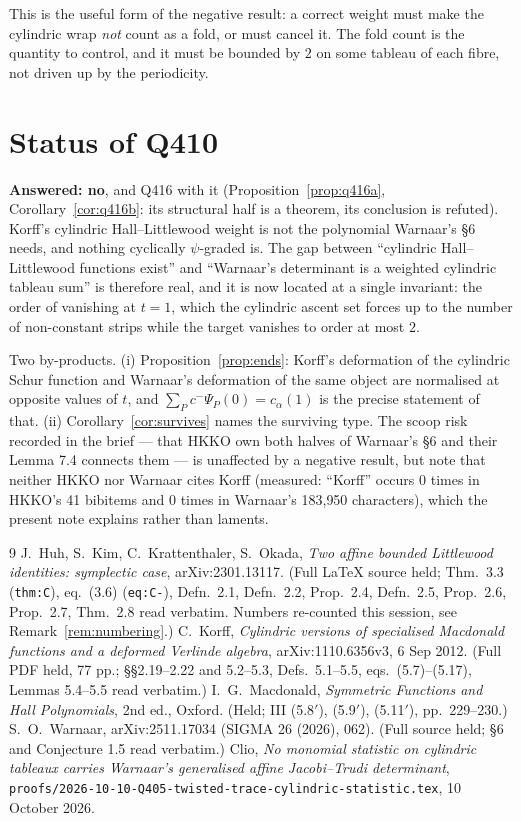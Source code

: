 \documentclass[11pt]{article}
\theoremstyle{definition}
\begin{document}
This is the useful form of the negative result: a correct weight must make the
cylindric wrap \emph{not} count as a fold, or must cancel it. The fold count is the
quantity to control, and it must be bounded by $2$ on some tableau of each fibre, not
driven up by the periodicity.

\section{Status of Q410}

\textbf{Answered: no}, and Q416 with it (Proposition~\ref{prop:q416a},
Corollary~\ref{cor:q416b}: its structural half is a theorem, its conclusion is
refuted). Korff's cylindric Hall--Littlewood weight is not the
polynomial Warnaar's \S6 needs, and nothing cyclically $\psi$-graded is. The
gap between ``cylindric Hall--Littlewood functions exist'' and ``Warnaar's
determinant is a weighted cylindric tableau sum'' is therefore real, and it is
now located at a single invariant: the order of vanishing at $t=1$, which the
cylindric ascent set forces up to the number of non-constant strips while the
target vanishes to order at most $2$.

Two by-products. (i) Proposition~\ref{prop:ends}: Korff's deformation of the
cylindric Schur function and Warnaar's deformation of the same object are
normalised at opposite values of $t$, and $\sum_P c^-\Psi_P(0)=c_\alpha(1)$
is the precise statement of that. (ii) Corollary~\ref{cor:survives} names the
surviving type. The scoop risk recorded in the brief --- that HKKO own both
halves of Warnaar's \S6 and their Lemma 7.4 connects them --- is unaffected by
a negative result, but note that neither HKKO nor Warnaar cites Korff
(measured: ``Korff'' occurs $0$ times in HKKO's 41 bibitems and $0$ times in
Warnaar's 183{,}950 characters), which the present note explains rather than
laments.

\begin{thebibliography}{9}
 J.~Huh, S.~Kim, C.~Krattenthaler, S.~Okada,
\emph{Two affine bounded Littlewood identities: symplectic case},
arXiv:2301.13117. (Full \LaTeX{} source held;
Thm.~3.3 (\texttt{thm:C}), eq.~(3.6) (\texttt{eq:C-}),
Defn.~2.1, Defn.~2.2, Prop.~2.4, Defn.~2.5, Prop.~2.6, Prop.~2.7, Thm.~2.8
read verbatim.  Numbers re-counted this session, see Remark~\ref{rem:numbering}.)
 C.~Korff, \emph{Cylindric versions of specialised Macdonald
functions and a deformed Verlinde algebra}, arXiv:1110.6356v3, 6 Sep 2012.
(Full PDF held, 77 pp.; \S\S2.19--2.22 and 5.2--5.3, Defs.~5.1--5.5,
eqs.~(5.7)--(5.17), Lemmas 5.4--5.5 read verbatim.)
 I.~G.~Macdonald, \emph{Symmetric Functions and Hall Polynomials},
2nd ed., Oxford. (Held; III (5.8$'$), (5.9$'$), (5.11$'$), pp.~229--230.)
 S.~O.~Warnaar, arXiv:2511.17034 (SIGMA 26 (2026), 062).
(Full source held; \S6 and Conjecture 1.5 read verbatim.)
 Clio, \emph{No monomial statistic on cylindric tableaux carries
Warnaar's generalised affine Jacobi--Trudi determinant},
\texttt{proofs/2026-10-10-Q405-twisted-trace-cylindric-statistic.tex},
10 October 2026.
\end{thebibliography}
\end{document}
